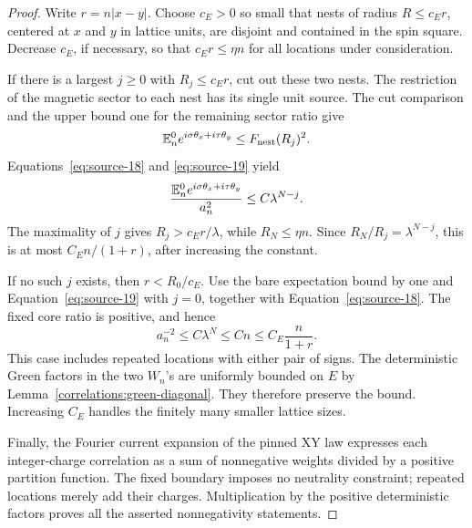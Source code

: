 \begin{proof}
Write \(r=n|x-y|\).  Choose \(c_E>0\) so small that nests of
radius \(R\leq c_Er\), centered at \(x\) and \(y\) in lattice
units, are disjoint and contained in the spin square.  Decrease
\(c_E\), if necessary, so that \(c_Er\leq\eta n\) for all
locations under consideration.

If there is a largest \(j\geq0\) with \(R_j\leq c_Er\), cut
out these two nests.  The restriction of the magnetic sector
to each nest has its single unit source.  The cut comparison
and the upper bound one for the remaining sector ratio give
\[
 \mathbb E_n^0e^{i\sigma\theta_x+i\tau\theta_y}
       \leq F_{\rm nest}(R_j)^2.
\]
Equations~\eqref{eq:source-18} and \eqref{eq:source-19} yield
\[
 \frac{\mathbb E_n^0e^{i\sigma\theta_x+i\tau\theta_y}}{a_n^2}
 \leq C\lambda^{N-j}.
\]
The maximality of \(j\) gives \(R_j>c_Er/\lambda\), while
\(R_N\leq\eta n\).  Since \(R_N/R_j=\lambda^{N-j}\),
this is at most \(C_E n/(1+r)\), after increasing the constant.

If no such \(j\) exists, then \(r<R_0/c_E\).  Use the bare
expectation bound by one and Equation~\eqref{eq:source-19}
with \(j=0\), together with Equation~\eqref{eq:source-18}.
The fixed core ratio is positive, and hence
\[
 a_n^{-2}\leq C\lambda^N\leq Cn
       \leq C_E\frac{n}{1+r}.
\]
This case includes repeated locations with either pair of signs.
The deterministic Green factors in the two \(W_n\)'s are uniformly
bounded on \(E\) by Lemma~\ref{correlations:green-diagonal}.
They therefore preserve the bound.  Increasing \(C_E\) handles
the finitely many smaller lattice sizes.

Finally, the Fourier current expansion of the pinned XY law
expresses each integer-charge correlation as a sum of
nonnegative weights divided by a positive partition function.
The fixed boundary imposes no neutrality constraint; repeated
locations merely add their charges.  Multiplication by the
positive deterministic factors proves all the asserted
nonnegativity statements.
\end{proof}
